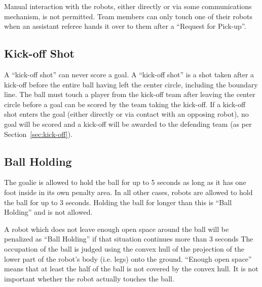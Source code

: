 \documentclass[12pt]{article}
\begin{document}
Manual interaction with the robots, either directly or via some
communications mechanism, is not permitted. Team members can only
touch one of their robots when an assistant referee hands it over to
them after a ``Request for Pick-up''.

\subsection{Kick-off Shot}
\label{sec:kick-off_shot}

A ``kick-off shot'' can never score a goal.  A ``kick-off shot'' is
a shot taken after a kick-off before the entire ball having left the
center circle, including the boundary line.  The ball must touch a
player from the kick-off team after leaving the center circle before
a goal can be scored by the team taking the kick-off.  If a kick-off
shot enters the goal (either directly or via contact with an
opposing robot), no goal will be scored and a kick-off will be
awarded to the defending team (as per Section~\ref{sec:kick-off}).


\subsection{Ball Holding}
\label{sec:ball_holding}

The goalie is allowed to hold the ball for up to 5 seconds as long
as it has one foot inside in its own penalty area.  In all other
cases, robots are allowed to hold the ball for up to 3 seconds.
Holding the ball for longer than this is ``Ball Holding'' and is not
allowed.

A robot which does not leave enough open space around the ball will
be penalized as ``Ball Holding'' if that situation continues more
than 3 seconds
The occupation of the ball is judged using the convex hull of the projection of the lower part of the robot's body (i.e. legs) onto the ground. ``Enough open space'' means that at least the half of the ball is not covered by the convex hull. It is not important whether the robot actually touches the ball.
\end{document}
